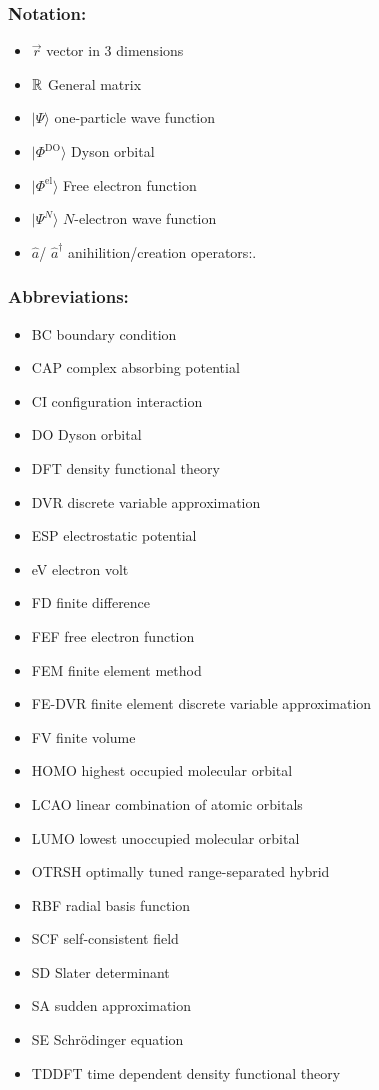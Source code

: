 \subsubsection{Notation:}
\begin{itemize}
   \item $\vec{r}$ vector in $3$ dimensions
   \item $\mathbb{R}$ General matrix
   \item $|\Psi\rangle$ one-particle wave function
   \item $|\Phi^\text{DO}\rangle$ Dyson orbital
   \item $|\Phi^\text{el}\rangle$ Free electron function
   \item $|\Psi^N\rangle$ $N$-electron wave function
   \item  $\hat{a}$/ $\hat{a}^\dagger$ anihilition/creation operators:.
\end{itemize}

\subsubsection{Abbreviations:}
\begin{itemize}
   \item BC  boundary condition
   \item CAP complex absorbing potential
   \item CI configuration interaction
   \item DO Dyson orbital
   \item DFT density functional theory
   \item DVR discrete variable approximation
   \item ESP electrostatic potential
   \item eV electron volt
   \item FD finite difference
   \item FEF free electron function
   \item FEM finite element method
   \item FE-DVR finite element discrete variable approximation
   \item FV finite volume
   \item HOMO highest occupied molecular orbital
   \item LCAO linear combination of atomic orbitals
   \item LUMO lowest unoccupied molecular orbital
   \item OTRSH optimally tuned range-separated hybrid
   \item RBF radial basis function
   \item SCF self-consistent field
   \item SD Slater determinant
   \item SA sudden approximation
   \item SE Schr\"odinger equation
   \item TDDFT time dependent density functional theory
\end{itemize}
